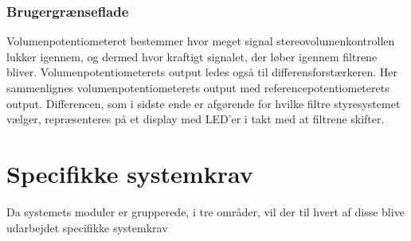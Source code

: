 \subsubsection{Brugergrænseflade}
\label{SystemkravBrugergraenseflade}
%
 Volumenpotentiometeret bestemmer hvor meget signal stereovolumenkontrollen lukker igennem, og dermed hvor kraftigt signalet, der løber igennem filtrene bliver. Volumenpotentiometerets output ledes også til differensforstærkeren. Her sammenlignes volumenpotentiometerets output med referencepotentiometerets output. Differencen, som i sidste ende er afgørende for hvilke filtre styresystemet vælger, repræsenteres på et display med LED'er i takt med at filtrene skifter.        
%
\newpage
\noindent
%
\section{Specifikke systemkrav}
\label{SpecifikkeSystemkrav}
%
Da systemets moduler er grupperede, i tre områder, vil der til hvert af disse blive udarbejdet specifikke systemkrav
%
